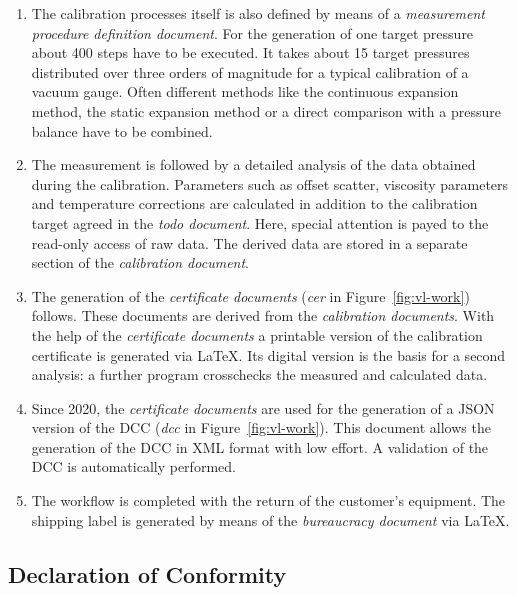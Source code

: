 \documentclass[3p,times,procedia]{elsarticle}
\begin{document}
\begin{enumerate}
\item The calibration processes itself is also defined by means of a
  \emph{measurement procedure definition document}.  For the
  generation of one target pressure about 400 steps have to be
  executed. It takes about 15 target pressures distributed over three
  orders of magnitude for a typical calibration of a vacuum
  gauge. Often different methods like the continuous expansion method,
  the static expansion method or a direct comparison with a pressure
  balance have to be combined.  %
  
\item The measurement is followed by a detailed analysis of the data
  obtained during the calibration. Parameters such as offset scatter,
  viscosity parameters and temperature corrections are calculated in addition to the
  calibration target agreed in the \emph{todo document}.
  Here, special attention is payed to the read-only access of raw
  data. The derived data are stored in a separate section of the
  \emph{calibration document}.
  
\item The generation of the \emph{certificate documents} (\emph{cer}
  in Figure~\ref{fig:vl-work}) follows.  These documents are derived
  from the \emph{calibration documents}. With the help of the
  \emph{certificate documents} a printable version of the calibration
  certificate is generated via \LaTeX. Its digital version is the
  basis for a second analysis: a further program crosschecks the
  measured and calculated data.
  
\item Since 2020, the \emph{certificate documents} are used for the
  generation of a JSON version of the DCC (\emph{dcc} in
  Figure~\ref{fig:vl-work}). This document allows the generation of the DCC
  in XML format with low effort. A validation of the DCC is automatically performed.

\item\label{itm:last} The workflow is completed with the return of the customer's
  equipment. The shipping label is generated by means of the 
  \emph{bureaucracy document} via \LaTeX.
\end{enumerate}



\subsection{Declaration of Conformity}
\end{document}
